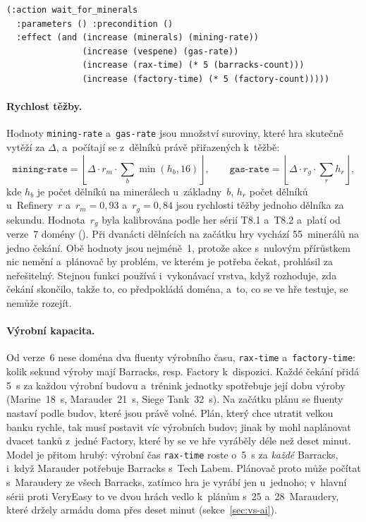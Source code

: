 \begin{lstlisting}[caption={Akce čekání (\enquote{hodiny}) v~doméně v11.},label=lst:wait,float,basicstyle=\ttfamily\footnotesize]
(:action wait_for_minerals
  :parameters () :precondition ()
  :effect (and (increase (minerals) (mining-rate))
               (increase (vespene) (gas-rate))
               (increase (rax-time) (* 5 (barracks-count)))
               (increase (factory-time) (* 5 (factory-count)))))
\end{lstlisting}

\paragraph{Rychlost těžby.} Hodnoty \texttt{mining-rate} a~\texttt{gas-rate} jsou množství suroviny, které hra skutečně vytěží za $\Delta$, a~počítají se z~dělníků právě přiřazených k~těžbě:
\[
	\texttt{mining-rate} = \left\lfloor \Delta \cdot r_m \cdot \sum_{b} \min(h_b, 16) \right\rfloor,
	\qquad
	\texttt{gas-rate} = \left\lfloor \Delta \cdot r_g \cdot \sum_{r} h_r \right\rfloor,
\]
kde $h_b$ je počet dělníků na minerálech u~základny~$b$, $h_r$ počet dělníků u~Refinery~$r$ a~$r_m = 0{,}93$ a~$r_g = 0{,}84$ jsou rychlosti těžby jednoho dělníka za sekundu. Hodnota~$r_g$ byla kalibrována podle her sérií T8.1 a~T8.2 a~platí od verze~7 domény (). Při dvanácti dělnících na začátku hry vychází 55~minerálů na jedno čekání. Obě hodnoty jsou nejméně~1, protože akce s~nulovým přírůstkem nic nemění a~plánovač by problém, ve kterém je potřeba čekat, prohlásil za neřešitelný. Stejnou funkci používá i~vykonávací vrstva, když rozhoduje, zda čekání skončilo, takže to, co předpokládá doména, a~to, co se ve hře testuje, se nemůže rozejít.

\paragraph{Výrobní kapacita.} Od verze~6 nese doména dva fluenty výrobního času, \texttt{rax-time} a~\texttt{factory-time}: kolik sekund výroby mají Barracks, resp. Factory k~dispozici. Každé čekání přidá 5~s za každou výrobní budovu a~trénink jednotky spotřebuje její dobu výroby (Marine~18~s, Marauder~21~s, Siege Tank~32~s). Na začátku plánu se fluenty nastaví podle budov, které jsou právě volné. Plán, který chce utratit velkou banku rychle, tak musí postavit víc výrobních budov; jinak by mohl naplánovat dvacet tanků z~jedné Factory, které by se ve hře vyráběly déle než deset minut. Model je přitom hrubý: výrobní čas \texttt{rax-time} roste o~5~s za \emph{každé} Barracks, i~když Marauder potřebuje Barracks s~Tech Labem. Plánovač proto může počítat s~Maraudery ze všech Barracks, zatímco hra je vyrábí jen u~jednoho; v~hlavní sérii proti VeryEasy to ve dvou hrách vedlo k~plánům s~25 a~28~Maraudery, které držely armádu doma přes deset minut (sekce~\ref{sec:vs-ai}).

